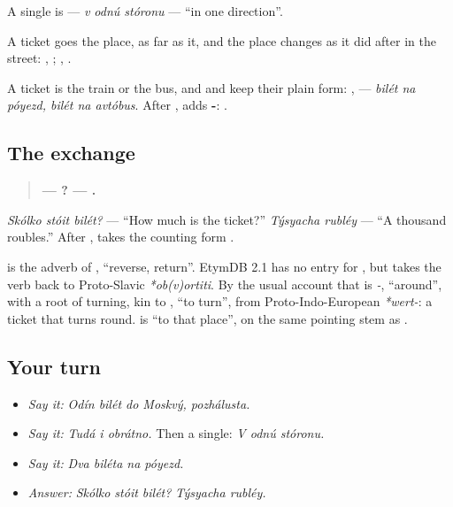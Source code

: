 A single is \textbf{  } — \emph{v odnú stóronu} — \textquotedblleft{}in one direction\textquotedblright{}.

\begin{grammarlens}[title={Grammar Lens: \ru{до} a place, \ru{на} a train}]
A ticket goes \textbf{} the place, as far as it, and the place changes as it did after \emph{} in the street: \emph{}, \emph{ }; \emph{}, \textbf{ }.

A ticket is \textbf{} the train or the bus, and \emph{} and \emph{} keep their plain form: \textbf{  }, \textbf{  } — \emph{bilét na póyezd, bilét na avtóbus}. After \emph{}, \emph{} adds \textbf{-}: \textbf{ }.
\end{grammarlens}

\subsection*{The exchange}
\begin{quote}
\textbf{—   ? —  .}
\end{quote}

\emph{Skólko stóit bilét?} — \textquotedblleft{}How much is the ticket?\textquotedblright{} \emph{Týsyacha rubléy} — \textquotedblleft{}A thousand roubles.\textquotedblright{} After \emph{}, \emph{} takes the counting form \textbf{}.

\begin{cousinweb}
\textbf{} is the adverb of \emph{}, \textquotedblleft{}reverse, return\textquotedblright{}. EtymDB 2.1 has no entry for \emph{}, but takes the verb \emph{} back to Proto-Slavic \emph{*ob(v)ortiti}. By the usual account that is \emph{-}, \textquotedblleft{}around\textquotedblright{}, with a root of turning, kin to \textbf{}, \textquotedblleft{}to turn\textquotedblright{}, from Proto-Indo-European \emph{*wert-}: a ticket that turns round. \textbf{} is \textquotedblleft{}to that place\textquotedblright{}, on the same pointing stem as \emph{}.
\end{cousinweb}

\subsection*{Your turn}
\begin{itemize}
\raggedright
  \item \emph{Say it:} \emph{Odín bilét do Moskvý, pozhálusta.}
  \item \emph{Say it:} \emph{Tudá i obrátno.} Then a single: \emph{V odnú stóronu.}
  \item \emph{Say it:} \emph{Dva biléta na póyezd.}
  \item \emph{Answer:} \emph{Skólko stóit bilét?} \emph{Týsyacha rubléy.}
\end{itemize}


